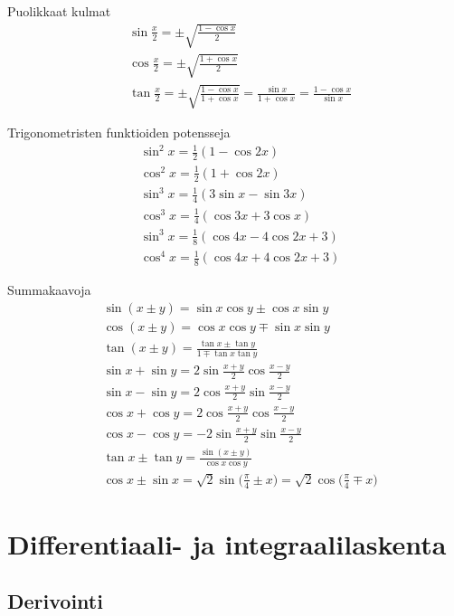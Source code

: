 Puolikkaat kulmat \cite[s. 32]{MAOL}
\begin{align*}
& \sin \frac{x}{2} = \pm \sqrt{\frac{1 - \cos x}{2}} \\
& \cos \frac{x}{2} = \pm \sqrt{\frac{1 + \cos x}{2}} \\
& \tan \frac{x}{2} = \pm \sqrt{\frac{1 - \cos x}{1 + \cos x}} = \frac{\sin x}{1 + \cos x} = \frac{1 - \cos x}{\sin x}
\end{align*}

Trigonometristen funktioiden potensseja \cite[s. 33]{MAOL}
\begin{align*}
& \sin^2 x = \frac{1}{2} (1- \cos 2x) \\
& \cos^2 x = \frac{1}{2} (1+ \cos 2x) \\
& \sin^3 x = \frac{1}{4} (3 \sin x - \sin 3x) \\
& \cos^3 x = \frac{1}{4} (\cos 3x + 3 \cos x) \\
& \sin^3 x = \frac{1}{8} (\cos 4x - 4 \cos 2x + 3) \\
& \cos^4 x = \frac{1}{8} (\cos 4x + 4 \cos 2x + 3)
\end{align*}

Summakaavoja \cite[s. 33]{MAOL}
\begin{align*}
& \sin ( x \pm y ) = \sin x \cos y \pm \cos x \sin y \\
& \cos (x \pm y ) = \cos x \cos y \mp \sin x \sin y \\
& \tan (x \pm y ) = \frac{\tan x \pm \tan y}{1 \mp \tan x \tan y} \\
& \sin x + \sin y = 2 \sin \frac{x+y}{2} \cos \frac{x-y}{2} \\
& \sin x - \sin y = 2 \cos \frac{x+y}{2} \sin \frac{x-y}{2} \\
& \cos x + \cos y = 2 \cos \frac{x+y}{2} \cos \frac{x-y}{2} \\
& \cos x - \cos y = -2 \sin \frac{x+y}{2} \sin \frac{x-y}{2} \\
& \tan x \pm \tan y = \frac{\sin(x \pm y)}{\cos x \cos y} \\
& \cos x \pm \sin x = \sqrt{2} \sin \Big( \frac{\pi}{4} \pm x \Big) = \sqrt{2} \cos \Big( \frac{\pi}{4} \mp x \Big) 
\end{align*}

\section{Differentiaali- ja integraalilaskenta}

\subsection{Derivointi}

